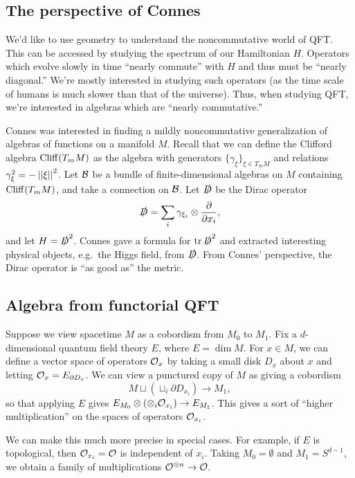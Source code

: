 \subsection{The perspective of Connes}

We'd like to use geometry to understand the noncommutative world of QFT.
This can be accessed by studying the spectrum of our Hamiltonian $H$.
Operators which evolve slowly in time ``nearly commute'' with $H$ and thus must be ``nearly diagonal.''
We're mostly interested in studying such operators (as the time scale of humans is much slower than that of the universe).
Thus, when studying QFT, we're interested in algebras which are ``nearly commutative.''

Connes was interested in finding a mildly noncommutative generalization of algebras of functions on a manifold $M$.
Recall that we can define the Clifford algebra $\operatorname{Cliff}(T_m M)$ as the algebra with generators $\{ \gamma_\xi \}_{\xi \in T_m M}$ and relations $\gamma_\xi^2 = -\left|\left|{\xi}\right|\right|^2$.
Let $\mathcal{B}$ be a bundle of finite-dimensional algebras on $M$ containing $\operatorname{Cliff}(T_m M)$, and take a connection on $\mathcal{B}$.
Let $\slashed{D}$ be the Dirac operator
\[
	\slashed{D} = \sum_i \gamma_{\xi_i} \otimes \frac{\partial}{\partial x_i},
\]
and let $H = \slashed{D}^2$.
Connes gave a formula for $\operatorname{tr} \slashed{D}^2$ and extracted interesting physical objects, e.g.\ the Higgs field, from $\slashed{D}$.
From Connes' perspective, the Dirac operator is ``as good as'' the metric.

\subsection{Algebra from functorial QFT}

Suppose we view spacetime $M$ as a cobordism from $M_0$ to $M_1$.
Fix a $d$-dimensional quantum field theory $E$, where $E = \dim M$.
For $x \in M$, we can define a vector space of operators $\mathcal{O}_x$ by taking a small disk $D_x$ about $x$ and letting $\mathcal{O}_x = E_{\partial D_x}$.
We can view a punctured copy of $M$ as giving a cobordism
\[
	M \sqcup \left(\sqcup_i \partial D_{x_i} \right) \to M_1,
\]
so that applying $E$ gives $E_{M_0} \otimes (\otimes_i \mathcal{O}_{x_i}) \to E_{M_1}$.
This gives a sort of ``higher multiplication'' on the spaces of operators $\mathcal{O}_{x_i}$.

We can make this much more precise in special cases.
For example, if $E$ is topological, then $\mathcal{O}_{x_i} = \mathcal{O}$ is independent of $x_i$.
Taking $M_0 = \emptyset$ and $M_1 = S^{d-1}$, we obtain a family of multiplications $\mathcal{O}^{\otimes n} \to \mathcal{O}$.

